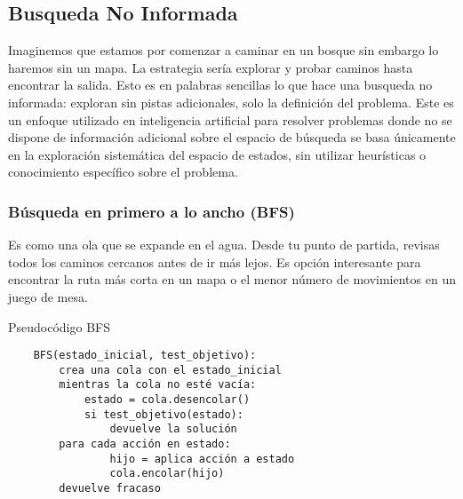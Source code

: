 \subsection{Busqueda No Informada}

Imaginemos que estamos por comenzar a caminar en un bosque sin embargo lo haremos sin un mapa. La 
estrategia sería explorar y probar caminos hasta encontrar la salida. Esto es en palabras sencillas 
lo que hace una busqueda no informada: exploran sin pistas adicionales, solo la definición del 
problema. Este es un enfoque utilizado en inteligencia artificial para resolver problemas donde no 
se dispone de información adicional sobre el espacio de búsqueda se basa únicamente en la 
exploración sistemática del espacio de estados, sin utilizar heurísticas o conocimiento específico 
sobre el problema.\\ 

\subsubsection*{Búsqueda en primero a lo ancho (BFS)} 

Es como una ola que se expande en el agua. Desde tu punto de partida, revisas todos los caminos 
cercanos antes de ir más lejos. Es opción interesante para encontrar la ruta más corta en un mapa 
o el menor número de movimientos en un juego de mesa.

\begin{myitemize} 
    \item[] Pseudocódigo BFS
    \begin{verbatim}
    BFS(estado_inicial, test_objetivo):
        crea una cola con el estado_inicial
        mientras la cola no esté vacía:
            estado = cola.desencolar()
            si test_objetivo(estado):
                devuelve la solución
        para cada acción en estado:
                hijo = aplica acción a estado
                cola.encolar(hijo)
        devuelve fracaso
    \end{verbatim}
\end{myitemize}

